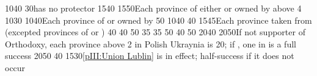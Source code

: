 %
%
%
{10}{40}{}%
%
%
{}{30}{\paysPologne has no protector}%
%
%
{15}{40}{}%
%
%
{15}{50}{Each province of either \paysCrimee or \paysMoldavie owned by
  \paysmajeurRussie above 4}%
%
%
%
\EUobjective{}{\granderegionAlaska}{\COL}%
{10}{30}{\EU@objEachCOL[\granderegionAlaska]}%
%
%
%
{10}{40}{Each province of \paysgeorgie or \paysperse owned by
  \paysmajeurRussie}%
%
%
{}{50}{}%
% 
%
{10}{40}{}%
%
%
{}{40}{}%
%
%
{15}{45}{Each province taken from \paysmajeurTurquie (excepted provinces of
  \paysgeorgie or \paysperse)}%
 
%
%
{}{40}{}%
%
%
{}{40}{}%
%
%
{}{50}{}%
%
%
{}{35}{}%
%
%
{}{35}{}%
%
%
%
{}{50}{}%
%
%
{}{40}{}%
%
%
{}{50}{}%
%
%
{20}{40}{\EU@objNoRUSBaltique}%
%
%
{20}{50}{If not supporter of Orthodoxy, each province above 2 in Polish
  Ukraynia is 20\VPs; if \Xorthodoxe, one \COL in \continentSiberia is a full
  success}%
%
%
%
{20}{50}{}%
%
%
{}{40}{}%
%
%
{15}{30}{\ref{pIII:Union Lublin} is in effect; half-success if it does not
  occur}%
